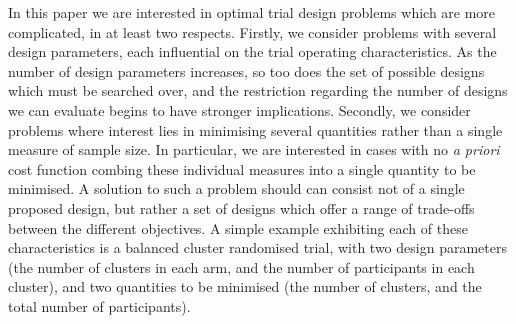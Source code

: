 \documentclass{article} %
\begin{document}
In this paper we are interested in optimal trial design problems which are more complicated, in at least two respects. Firstly, we consider problems with several design parameters, each influential on the trial operating characteristics. As the number of design parameters increases, so too does the set of possible designs which must be searched over, and the restriction regarding the number of designs we can evaluate begins to have stronger implications. Secondly, we consider problems where interest lies in minimising several quantities rather than a single measure of sample size. In particular, we are interested in cases with no \emph{a priori} cost function combing these individual measures into a single quantity to be minimised. A solution to such a problem should can consist not of a single proposed design, but rather a set of designs which offer a range of trade-offs between the different objectives. A simple example exhibiting each of these characteristics is a balanced cluster randomised trial, with two design parameters (the number of clusters in each arm, and the number of participants in each cluster), and two quantities to be minimised (the number of clusters, and the total number of participants).


\end{document}
